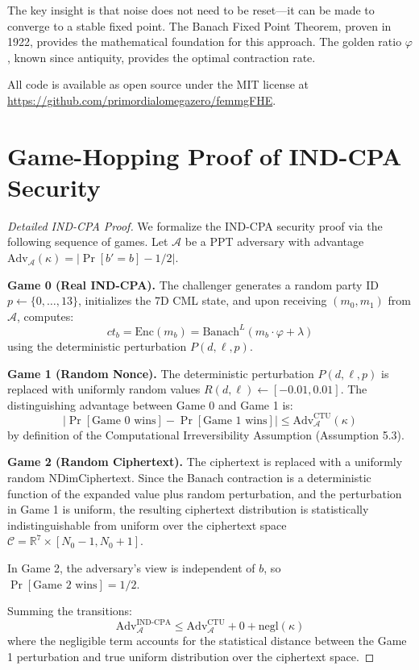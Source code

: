 \documentclass[11pt,a4paper]{article}
\begin{document}
The key insight is that noise does not need to be reset---it can be made to converge to a stable fixed point. The Banach Fixed Point Theorem, proven in 1922, provides the mathematical foundation for this approach. The golden ratio $\varphi$, known since antiquity, provides the optimal contraction rate.

All code is available as open source under the MIT license at \url{https://github.com/primordialomegazero/femmgFHE}.

\appendix
\section{Game-Hopping Proof of IND-CPA Security}
\label{app:gamehopping}

\begin{proof}[Detailed IND-CPA Proof]
We formalize the IND-CPA security proof via the following sequence of games. Let $\mathcal{A}$ be a PPT adversary with advantage $\text{Adv}_{\mathcal{A}}(\kappa) = |\Pr[b' = b] - 1/2|$.

\textbf{Game 0 (Real IND-CPA).} The challenger generates a random party ID $p \leftarrow \{0,\ldots,13\}$, initializes the 7D CML state, and upon receiving $(m_0, m_1)$ from $\mathcal{A}$, computes:
\begin{equation}
    ct_b = \text{Enc}(m_b) = \text{Banach}^L(m_b \cdot \varphi + \lambda)
\end{equation}
using the deterministic perturbation $P(d,\ell,p)$.

\textbf{Game 1 (Random Nonce).} The deterministic perturbation $P(d,\ell,p)$ is replaced with uniformly random values $R(d,\ell) \leftarrow [-0.01, 0.01]$. The distinguishing advantage between Game 0 and Game 1 is:
\begin{equation}
    |\Pr[\text{Game 0 wins}] - \Pr[\text{Game 1 wins}]| \leq \text{Adv}^{\text{CTU}}_{\mathcal{A}}(\kappa)
\end{equation}
by definition of the Computational Irreversibility Assumption (Assumption 5.3).

\textbf{Game 2 (Random Ciphertext).} The ciphertext is replaced with a uniformly random NDimCiphertext. Since the Banach contraction is a deterministic function of the expanded value plus random perturbation, and the perturbation in Game 1 is uniform, the resulting ciphertext distribution is statistically indistinguishable from uniform over the ciphertext space $\mathcal{C} = \mathbb{R}^7 \times [N_0-1, N_0+1]$.

In Game 2, the adversary's view is independent of $b$, so $\Pr[\text{Game 2 wins}] = 1/2$.

Summing the transitions:
\begin{equation}
    \text{Adv}^{\text{IND-CPA}}_{\mathcal{A}} \leq \text{Adv}^{\text{CTU}}_{\mathcal{A}} + 0 + \text{negl}(\kappa)
\end{equation}
where the negligible term accounts for the statistical distance between the Game 1 perturbation and true uniform distribution over the ciphertext space.
\end{proof}
\end{document}
